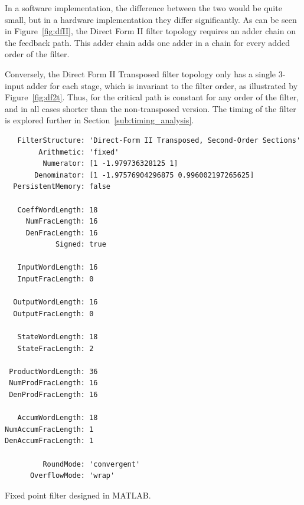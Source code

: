 \documentclass[]{article}
\begin{document}
In a software implementation, the difference between the two would be quite small, but in a hardware implementation they differ significantly. As can be seen in Figure~\ref{fig:dfII}, the Direct Form II filter topology requires an adder chain on the feedback path. This adder chain adds one adder in a chain for every added order of the filter.

Conversely, the Direct Form II Transposed filter topology only has a single 3-input adder for each stage, which is invariant to the filter order, as illustrated by Figure~\ref{fig:df2t}.
Thus, for the critical path is constant for any order of the filter, and in all cases shorter than the non-transposed version. The timing of the filter is explored further in Section~\ref{sub:timing_analysis}.


\begin{table}[tbp]
	\begin{center}
		\begin{lstlisting}
   FilterStructure: 'Direct-Form II Transposed, Second-Order Sections'
        Arithmetic: 'fixed'
         Numerator: [1 -1.979736328125 1]                  
       Denominator: [1 -1.97576904296875 0.996002197265625]
  PersistentMemory: false

   CoeffWordLength: 18                
     NumFracLength: 16                
     DenFracLength: 16
            Signed: true              
                                      
   InputWordLength: 16                
   InputFracLength: 0                 
                                      
  OutputWordLength: 16
  OutputFracLength: 0                 
                                      
   StateWordLength: 18
   StateFracLength: 2                 
                                      
 ProductWordLength: 36                
 NumProdFracLength: 16                
 DenProdFracLength: 16                
                                      
   AccumWordLength: 18                
NumAccumFracLength: 1                 
DenAccumFracLength: 1                 

         RoundMode: 'convergent'      
      OverflowMode: 'wrap'  
		\end{lstlisting}
	\end{center}
	\caption{Fixed point filter designed in MATLAB.}
	\label{tab:Hdsdsos}
\end{table}
\end{document}

